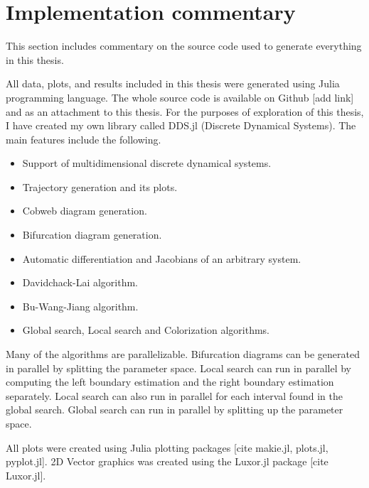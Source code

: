 \section{Implementation commentary}
This section includes commentary on the source code used to generate everything in this thesis.
\par
All data, plots, and results included in this thesis were generated using Julia programming language.
The whole source code is available on Github [add link] and as an attachment to this thesis.
For the purposes of exploration of this thesis, I have created my own library called DDS.jl (Discrete Dynamical Systems).
The main features include the following.
\begin{itemize}
    \item Support of multidimensional discrete dynamical systems.
    \item Trajectory generation and its plots.
    \item Cobweb diagram generation.
    \item Bifurcation diagram generation.
    \item Automatic differentiation and Jacobians of an arbitrary system.
    \item Davidchack-Lai algorithm.
    \item Bu-Wang-Jiang algorithm.
    \item Global search, Local search and Colorization algorithms.
\end{itemize}
Many of the algorithms are parallelizable.
Bifurcation diagrams can be generated in parallel by splitting the parameter space.
Local search can run in parallel by computing the left boundary estimation and the right boundary estimation separately.
Local search can also run in parallel for each interval found in the global search.
Global search can run in parallel by splitting up the parameter space.
\par
All plots were created using Julia plotting packages [cite makie.jl, plots.jl, pyplot.jl].
2D Vector graphics was created using the Luxor.jl package [cite Luxor.jl].

\endinput